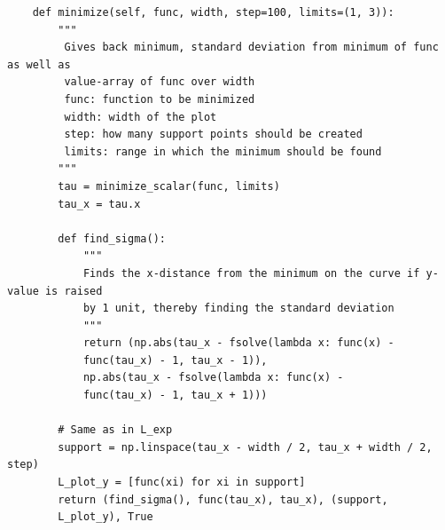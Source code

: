 \documentclass[english,  %
parskip=full,   %
headsepline]{scrartcl}
\begin{document}
\begin{verbatim}
    def minimize(self, func, width, step=100, limits=(1, 3)):
        """
         Gives back minimum, standard deviation from minimum of func as well as 
         value-array of func over width
         func: function to be minimized
         width: width of the plot
         step: how many support points should be created
         limits: range in which the minimum should be found
        """
        tau = minimize_scalar(func, limits)
        tau_x = tau.x

        def find_sigma():
            """
            Finds the x-distance from the minimum on the curve if y-value is raised
            by 1 unit, thereby finding the standard deviation
            """
            return (np.abs(tau_x - fsolve(lambda x: func(x) - 
            func(tau_x) - 1, tau_x - 1)),
            np.abs(tau_x - fsolve(lambda x: func(x) - 
            func(tau_x) - 1, tau_x + 1)))

        # Same as in L_exp
        support = np.linspace(tau_x - width / 2, tau_x + width / 2, step)
        L_plot_y = [func(xi) for xi in support]
        return (find_sigma(), func(tau_x), tau_x), (support,
        L_plot_y), True
\end{verbatim}
\end{document}
